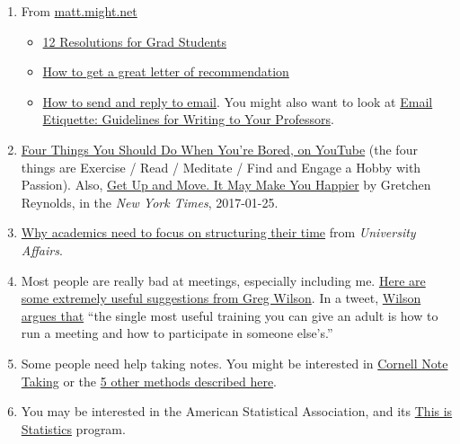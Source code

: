 \documentclass[
]{book}
\providecommand{\tightlist}{%
  \setlength{\itemsep}{0pt}\setlength{\parskip}{0pt}}
\begin{document}
\begin{enumerate}
\def\labelenumi{\arabic{enumi}.}
\tightlist
\item
  From \href{http://matt.might.net/articles/}{matt.might.net}

  \begin{itemize}
  \tightlist
  \item
    \href{http://matt.might.net/articles/grad-student-resolutions/}{12 Resolutions for Grad Students}
  \item
    \href{http://matt.might.net/articles/how-to-recommendation-letter/}{How to get a great letter of recommendation}
  \item
    \href{http://matt.might.net/articles/how-to-email/}{How to send and reply to email}. You might also want to look at \href{https://www.math.uh.edu/~tomforde/Email-Etiquette.html}{Email Etiquette: Guidelines for Writing to Your Professors}.
  \end{itemize}
\item
  \href{https://www.youtube.com/watch?v=d9W2GO1LhP4}{Four Things You Should Do When You're Bored, on YouTube} (the four things are Exercise / Read / Meditate / Find and Engage a Hobby with Passion). Also, \href{https://www.nytimes.com/2017/01/25/well/move/get-up-and-move-it-may-make-you-happier.html}{Get Up and Move. It May Make You Happier} by Gretchen Reynolds, in the \emph{New York Times}, 2017-01-25.
\item
  \href{https://www.universityaffairs.ca/career-advice/career-advice-article/academics-need-focus-structuring-time/}{Why academics need to focus on structuring their time} from \emph{University Affairs}.
\item
  Most people are really bad at meetings, especially including me. \href{http://third-bit.com/2018/05/11/meetings.html}{Here are some extremely useful suggestions from Greg Wilson}. In a tweet, \href{https://twitter.com/gvwilson/status/994553693772099589}{Wilson argues that} ``the single most useful training you can give an adult is how to run a meeting and how to participate in someone else's.''
\item
  Some people need help taking notes. You might be interested in \href{https://medium.goodnotes.com/study-with-ease-the-best-way-to-take-notes-2749a3e8297b}{Cornell Note Taking} or the \href{https://collegeinfogeek.com/how-to-take-notes-in-college/}{5 other methods described here}.
\item
  You may be interested in the American Statistical Association, and its \href{https://thisisstatistics.org/students/}{This is Statistics} program.
\end{enumerate}
\end{document}
